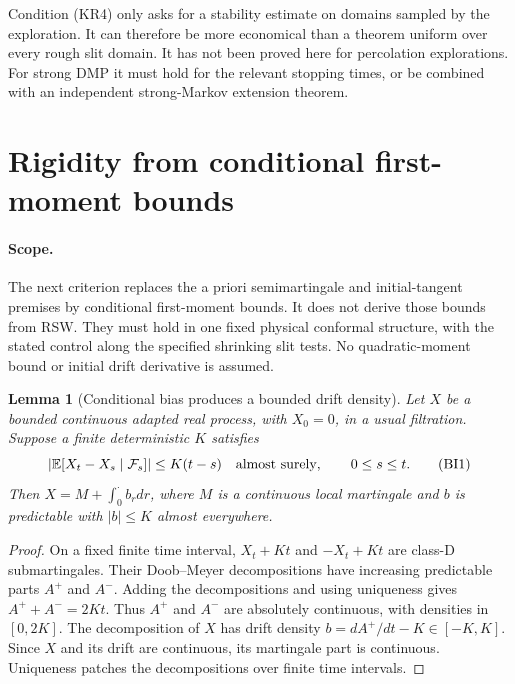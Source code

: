 \documentclass[11pt]{article}
\newtheorem{lemma}[theorem]{Lemma}
\theoremstyle{definition}\newtheorem{definition}[theorem]{Definition}
\theoremstyle{remark}\newtheorem{remark}[theorem]{Remark}
\begin{document}
Condition (KR4) only asks for a stability estimate on domains sampled by
the exploration. It can therefore be more economical than a theorem
uniform over every rough slit domain. It has not been proved here for
percolation explorations. For strong DMP it must hold for the relevant
stopping times, or be combined with an independent strong-Markov
extension theorem.


\section{Rigidity from conditional first-moment bounds}
\label{sec:conditional-bias}

\paragraph{Scope.}
The next criterion replaces the a priori semimartingale and initial-tangent
premises by conditional first-moment bounds. It does not derive those bounds
from RSW. They must hold in one fixed physical conformal structure, with the stated control
along the specified shrinking slit tests. No quadratic-moment bound or
initial drift derivative is assumed.

\begin{lemma}[Conditional bias produces a bounded drift density]
\label{lem:cbias-doobmeyer}
Let $X$ be a bounded continuous adapted real process, with $X_0=0$, in a
usual filtration. Suppose a finite deterministic $K$ satisfies
\[
 \left|\mathbb E[X_t-X_s\mid\mathcal F_s]\right|
       \le K(t-s) \quad\hbox{almost surely},\qquad 0\le s\le t.
 \tag{BI1}
\]
Then $X=M+\int_0^\cdot b_rdr$, where $M$ is a continuous local martingale
and $b$ is predictable with $|b|\le K$ almost everywhere.
\end{lemma}
\begin{proof}
On a fixed finite time interval, $X_t+Kt$ and $-X_t+Kt$ are class-D
submartingales. Their Doob--Meyer decompositions have increasing predictable
parts $A^+$ and $A^-$. Adding the decompositions and using uniqueness gives
$A^++A^-=2Kt$. Thus $A^+$ and $A^-$ are absolutely continuous, with
densities in $[0,2K]$. The decomposition of $X$ has drift density
$b=dA^+/dt-K\in[-K,K]$. Since $X$ and its drift are continuous, its
martingale part is continuous. Uniqueness patches the decompositions over
finite time intervals.
\end{proof}
\end{document}
